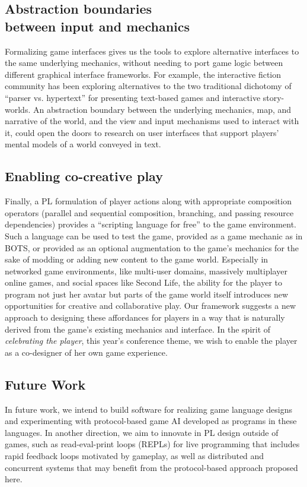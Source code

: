 \subsection{Abstraction boundaries \\ between input and mechanics}


Formalizing game interfaces gives us the tools to explore alternative
interfaces to the same underlying mechanics, without needing to port
game logic between different graphical interface frameworks. For example,
the interactive fiction community has been exploring alternatives to the
two traditional dichotomy of ``parser vs. hypertext'' for presenting
text-based games and interactive story-worlds. An abstraction boundary
between the underlying mechanics, map, and narrative of the world, and the
view and input mechanisms used to interact with it, could open the doors to
research on user interfaces that support players' mental models of a world
conveyed in text.

\subsection{Enabling co-creative play}

Finally, a PL formulation of player actions along with appropriate
composition operators (parallel and sequential composition, branching, and
passing resource dependencies) provides a ``scripting language for free''
to the game environment. 
Such a language can be used to test the game, provided as a game mechanic
as in BOTS, or provided as an optional augmentation to the game's mechanics
for the sake of modding or adding new content to the game world. Especially
in networked game environments, like multi-user domains, massively
multiplayer online games, and social spaces like Second Life, the ability
for the player to program not just her avatar but parts of the game world
itself introduces new opportunities for creative and collaborative play.
Our framework suggests a new approach to designing these affordances for
players in a way that is naturally derived from the game's existing
mechanics and interface.  In the spirit of {\em celebrating the player},
this year's conference theme, we wish to enable the player as a
co-designer of her own game experience.


\subsection{Future Work}
  In future work, we intend to build software for realizing game language
  designs and experimenting with protocol-based game AI developed as
  programs in these languages. In another direction, we aim to innovate in
  PL design outside of games, such as read-eval-print loops (REPLs) for
  live programming that includes rapid feedback loops motivated by
  gameplay, as well as distributed and concurrent systems that may benefit
  from the protocol-based approach proposed here.


